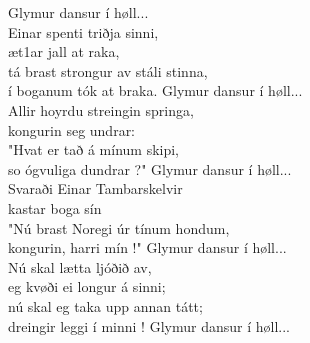 \begin{flushleft}
\hops
\hspace{0.9cm}Glymur dansur í høll...
\hops
{}\\
Einar spenti triðja sinni,\\
æt1ar jall at raka,\\
tá brast strongur av stáli stinna,\\
í boganum tók at braka.
\hops
\hspace{0.9cm}Glymur dansur í høll...
\hops
{}\\
Allir hoyrdu streingin springa,\\
kongurin seg undrar:\\
"Hvat er tað á mínum skipi,\\
so ógvuliga dundrar ?"
\hops
\hspace{0.9cm}Glymur dansur í høll...
\hops
{}\\
Svaraði Einar Tambarskelvir\\
kastar boga sín\\
"Nú brast Noregi úr tínum hondum,\\
kongurin, harri mín !"
\hops
\hspace{0.9cm}Glymur dansur í høll...
\hops
{}\\
Nú skal lætta ljóðið av,\\
eg kvøði ei longur á sinni;\\
nú skal eg taka upp annan tátt;\\
dreingir leggi í minni !
\hops
\hspace{0.9cm}Glymur dansur í høll...
\end{flushleft}
\newpage
{}
